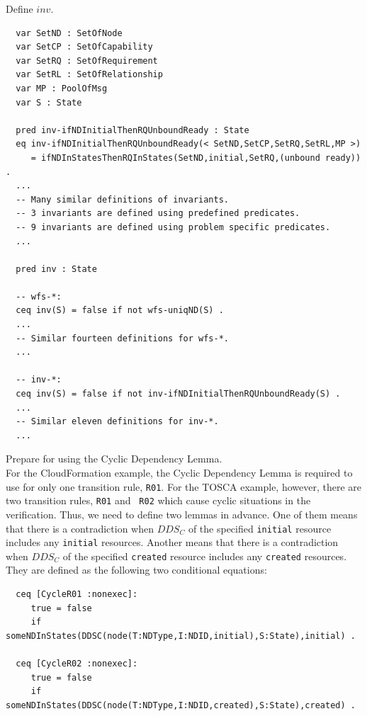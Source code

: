 \documentclass[12pt]{report}
\begin{document}
 Define $inv$. 
\small
\begin{verbatim}
  var SetND : SetOfNode
  var SetCP : SetOfCapability
  var SetRQ : SetOfRequirement
  var SetRL : SetOfRelationship
  var MP : PoolOfMsg
  var S : State

  pred inv-ifNDInitialThenRQUnboundReady : State
  eq inv-ifNDInitialThenRQUnboundReady(< SetND,SetCP,SetRQ,SetRL,MP >)
     = ifNDInStatesThenRQInStates(SetND,initial,SetRQ,(unbound ready)) .
  ...
  -- Many similar definitions of invariants.
  -- 3 invariants are defined using predefined predicates.
  -- 9 invariants are defined using problem specific predicates.
  ...

  pred inv : State

  -- wfs-*:
  ceq inv(S) = false if not wfs-uniqND(S) .
  ...
  -- Similar fourteen definitions for wfs-*.  
  ...

  -- inv-*:
  ceq inv(S) = false if not inv-ifNDInitialThenRQUnboundReady(S) .
  ...
  -- Similar eleven definitions for inv-*.  
  ...

\end{verbatim}
\normalsize

 Prepare for using the Cyclic Dependency
Lemma. \\
For the CloudFormation example, the Cyclic Dependency Lemma is
required to use for only one transition rule, {\tt R01}. For
the TOSCA example, however, there are two transition rules, {\tt R01} and {\tt
  R02} which cause cyclic situations in the verification. Thus, we
need to define two lemmas in advance.  One of them means that there is
a contradiction when $\mathit{DDS_C}$ of the specified {\tt initial} resource
includes any {\tt initial} resources.  Another means that there is a
contradiction when $\mathit{DDS_C}$ of the specified {\tt created} resource
includes any {\tt created} resources.  They are defined as the
following two conditional equations:
\small
\begin{verbatim}
  ceq [CycleR01 :nonexec]: 
     true = false
     if someNDInStates(DDSC(node(T:NDType,I:NDID,initial),S:State),initial) .

  ceq [CycleR02 :nonexec]: 
     true = false
     if someNDInStates(DDSC(node(T:NDType,I:NDID,created),S:State),created) .

\end{verbatim}
\normalsize
\end{document}
